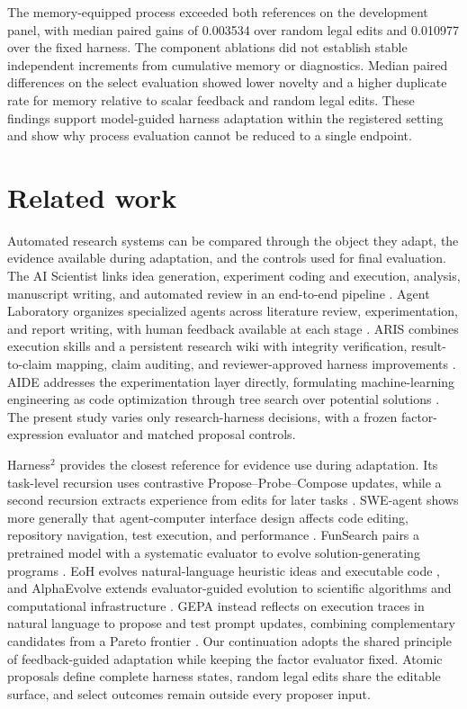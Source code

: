 The memory-equipped process exceeded both references on the development panel, with median paired gains of 0.003534 over random legal edits and 0.010977 over the fixed harness. The component ablations did not establish stable independent increments from cumulative memory or diagnostics. Median paired differences on the select evaluation showed lower novelty and a higher duplicate rate for memory relative to scalar feedback and random legal edits. These findings support model-guided harness adaptation within the registered setting and show why process evaluation cannot be reduced to a single endpoint.

\section{Related work}
\label{sec:related}

Automated research systems can be compared through the object they adapt, the evidence available during adaptation, and the controls used for final evaluation. The AI Scientist links idea generation, experiment coding and execution, analysis, manuscript writing, and automated review in an end-to-end pipeline \citep{lu2026towards}. Agent Laboratory organizes specialized agents across literature review, experimentation, and report writing, with human feedback available at each stage \citep{schmidgall2025agent}. ARIS combines execution skills and a persistent research wiki with integrity verification, result-to-claim mapping, claim auditing, and reviewer-approved harness improvements \citep{yang2026aris}. AIDE addresses the experimentation layer directly, formulating machine-learning engineering as code optimization through tree search over potential solutions \citep{jiang2025aide}. The present study varies only research-harness decisions, with a frozen factor-expression evaluator and matched proposal controls.

Harness$^2$ provides the closest reference for evidence use during adaptation. Its task-level recursion uses contrastive Propose--Probe--Compose updates, while a second recursion extracts experience from edits for later tasks \citep{xu2026harness2}. SWE-agent shows more generally that agent-computer interface design affects code editing, repository navigation, test execution, and performance \citep{yang2024sweagent}. FunSearch pairs a pretrained model with a systematic evaluator to evolve solution-generating programs \citep{romera2023mathematical}. EoH evolves natural-language heuristic ideas and executable code \citep{liu2024evolution}, and AlphaEvolve extends evaluator-guided evolution to scientific algorithms and computational infrastructure \citep{novikov2025alphaevolve}. GEPA instead reflects on execution traces in natural language to propose and test prompt updates, combining complementary candidates from a Pareto frontier \citep{agrawal2025gepa}. Our continuation adopts the shared principle of feedback-guided adaptation while keeping the factor evaluator fixed. Atomic proposals define complete harness states, random legal edits share the editable surface, and select outcomes remain outside every proposer input.

